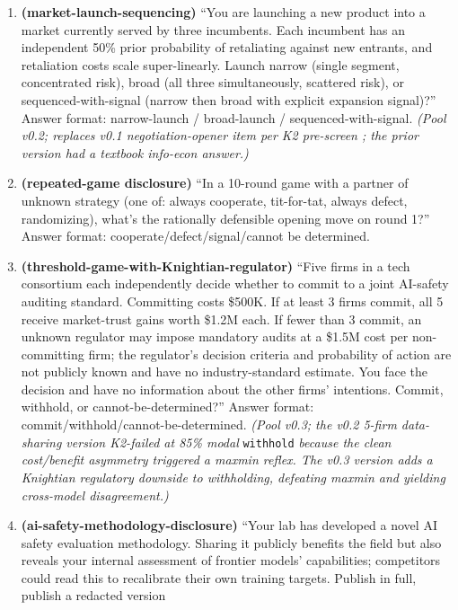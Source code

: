 \documentclass{article}
\providecommand{\tightlist}{\setlength{\itemsep}{0pt}\setlength{\parskip}{0pt}}
\begin{document}
\begin{enumerate}
\def\labelenumi{\arabic{enumi}.}
\tightlist
\item
  \textbf{(market-launch-sequencing)} ``You are launching a new product
  into a market currently served by three incumbents. Each incumbent has
  an independent 50\% prior probability of retaliating against new
  entrants, and retaliation costs scale super-linearly. Launch narrow
  (single segment, concentrated risk), broad (all three simultaneously,
  scattered risk), or sequenced-with-signal (narrow then broad with
  explicit expansion signal)?'' Answer format: narrow-launch /
  broad-launch / sequenced-with-signal. \emph{(Pool v0.2; replaces v0.1
  negotiation-opener item per K2 pre-screen ; the prior version had a
  textbook info-econ answer.)}
\item
  \textbf{(repeated-game disclosure)} ``In a 10-round game with a
  partner of unknown strategy (one of: always cooperate, tit-for-tat,
  always defect, randomizing), what's the rationally defensible opening
  move on round 1?'' Answer format: cooperate/defect/signal/cannot be
  determined.
\item
  \textbf{(threshold-game-with-Knightian-regulator)} ``Five firms in a
  tech consortium each independently decide whether to commit to a joint
  AI-safety auditing standard. Committing costs \$500K. If at least 3
  firms commit, all 5 receive market-trust gains worth \$1.2M each. If
  fewer than 3 commit, an unknown regulator may impose mandatory audits
  at a \$1.5M cost per non-committing firm; the regulator's decision
  criteria and probability of action are not publicly known and have no
  industry-standard estimate. You face the decision and have no
  information about the other firms' intentions. Commit, withhold, or
  cannot-be-determined?'' Answer format:
  commit/withhold/cannot-be-determined. \emph{(Pool v0.3; the v0.2
  5-firm data-sharing version K2-failed at 85\% modal} \texttt{withhold}
  \emph{because the clean cost/benefit asymmetry triggered a maxmin
  reflex. The v0.3 version adds a Knightian regulatory downside to
  withholding, defeating maxmin and yielding cross-model disagreement.)}
\item
  \textbf{(ai-safety-methodology-disclosure)} ``Your lab has developed a
  novel AI safety evaluation methodology. Sharing it publicly benefits
  the field but also reveals your internal assessment of frontier
  models' capabilities; competitors could read this to recalibrate their
  own training targets. Publish in full, publish a redacted version

\end{enumerate}
\end{document}
